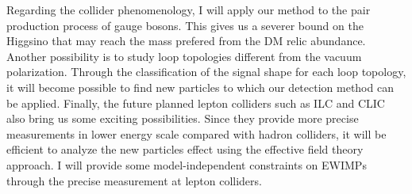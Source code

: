 \documentclass[12pt,notitlepage]{book}
\begin{document}
Regarding the collider phenomenology, I will apply our method to the
pair production process of gauge bosons.  This gives us a severer bound
on the Higgsino that may reach the mass prefered from the DM relic
abundance.  Another possibility is to study loop topologies different
from the vacuum polarization.  Through the classification of the signal
shape for each loop topology, it will become possible to find new
particles to which our detection method can be applied.  Finally, the
future planned lepton colliders such as ILC and CLIC also bring us some
exciting possibilities.  Since they provide more precise measurements in
lower energy scale compared with hadron colliders, it will be efficient
to analyze the new particles effect using the effective field theory
approach.  I will provide some model-independent constraints on EWIMPs
through the precise measurement at lepton colliders.
 
\end{document}
